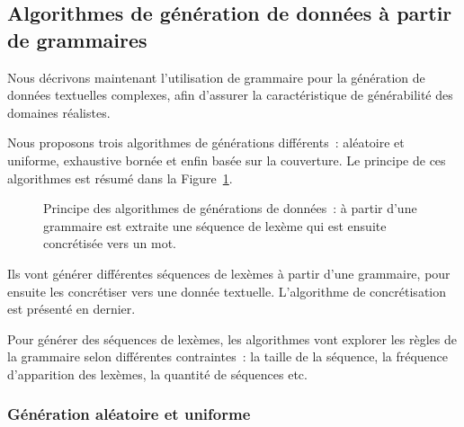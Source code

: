 %
%

\subsection{Algorithmes de génération de données à partir de grammaires}
\label{subsection:data:algorithms}

Nous décrivons maintenant l'utilisation de grammaire pour la génération de
données textuelles complexes, afin d'assurer la caractéristique de générabilité
des domaines réalistes.

Nous proposons trois algorithmes de générations différents~: aléatoire et
uniforme, exhaustive bornée et enfin basée sur la couverture. Le principe de
ces algorithmes est résumé dans la Figure~\ref{figure:data:grammar}.
%
\begin{figure}


\caption{\label{figure:data:grammar} Principe des algorithmes de générations de
données~: à partir d'une grammaire est extraite une séquence de lexème qui est
ensuite concrétisée vers un mot.}

\end{figure}
%
Ils vont générer différentes séquences de lexèmes à partir d'une grammaire, pour
ensuite les concrétiser vers une donnée textuelle. L'algorithme de
concrétisation est présenté en dernier.

Pour générer des séquences de lexèmes, les algorithmes vont explorer les règles
de la grammaire selon différentes contraintes~: la taille de la séquence, la
fréquence d'apparition des lexèmes, la quantité de séquences etc.

\subsubsection{Génération aléatoire et uniforme}
\label{subsection:data:random_uniform_generation}

